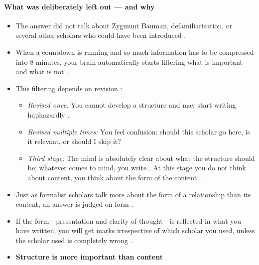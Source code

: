 \paragraph{What was deliberately left out --- and why}
\begin{itemize}
    \item The answer did not talk about Zygmunt Bauman, defamiliarisation, or several other scholars who could have been introduced .
    \item When a countdown is running and so much information has to be compressed into 8 minutes, your brain automatically starts filtering what is important and what is not .
    \item This filtering depends on revision :
    \begin{itemize}
        \item \textit{Revised once:} You cannot develop a structure and may start writing haphazardly .
        \item \textit{Revised multiple times:} You feel confusion: should this scholar go here, is it relevant, or should I skip it? 
        \item \textit{Third stage:} The mind is absolutely clear about what the structure should be; whatever comes to mind, you write . At this stage you do not think about content, you think about the form of the content .
    \end{itemize}
\end{itemize}

\begin{KeyConcept}
\begin{itemize}
    \item Just as formalist scholars talk more about the form of a relationship than its content, an answer is judged on form .
    \item If the form---presentation and clarity of thought---is reflected in what you have written, you will get marks irrespective of which scholar you used, unless the scholar used is completely wrong .
    \item \textbf{Structure is more important than content} .
\end{itemize}
\end{KeyConcept}

